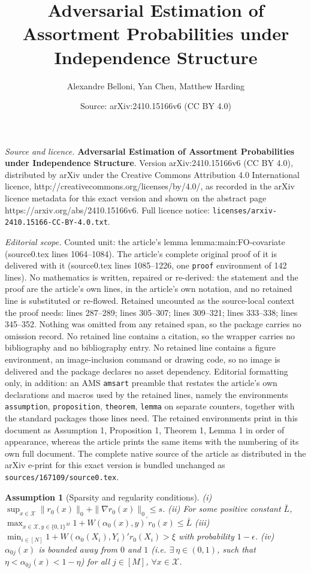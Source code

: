 \documentclass[10pt,a4paper]{amsart}
\title{{\textbf{\Large{}{}{}{}Adversarial Estimation of Assortment Probabilities under Independence Structure}}}
\author{Alexandre Belloni, Yan Chen, Matthew Harding}
\date{Source: arXiv:2410.15166v6 (CC BY 4.0)}
\newtheorem{assumption}{Assumption}
\begin{document}
\maketitle

\noindent\emph{Source and licence.} {\textbf{\Large{}{}{}{}Adversarial Estimation of Assortment Probabilities under Independence Structure}}. Version arXiv:2410.15166v6 (CC BY 4.0), distributed by arXiv under the Creative Commons Attribution 4.0 International licence, http://creativecommons.org/licenses/by/4.0/, as recorded in the arXiv licence metadata for this exact version and shown on the abstract page https://arxiv.org/abs/2410.15166v6. Full licence notice: \texttt{licenses/arxiv-2410.15166-CC-BY-4.0.txt}.\par\smallskip

\noindent\textit{Editorial scope.} Counted unit: the article's lemma lemma:main:FO-covariate (source0.tex lines 1064--1084). The article's complete original proof of it is delivered with it (source0.tex lines 1085--1226, one \texttt{proof} environment of 142 lines). No mathematics is written, repaired or re-derived: the statement and the proof are the article's own lines, in the article's own notation, and no retained line is substituted or re-flowed.  Retained uncounted as the source-local context the proof needs: lines 287--289; lines 305--307; lines 309--321; lines 333--338; lines 345--352.  Nothing was omitted from any retained span, so the package carries no omission record.  No retained line contains a citation, so the wrapper carries no bibliography and no bibliography entry.  No retained line contains a figure environment, an image-inclusion command or drawing code, so no image is delivered and the package declares no asset dependency.  Editorial formatting only, in addition: an AMS \texttt{amsart} preamble that restates the article's own declarations and macros used by the retained lines, namely the environments \texttt{assumption}, \texttt{proposition}, \texttt{theorem}, \texttt{lemma} on separate counters, together with the standard packages those lines need.  The retained environments print in this document as Assumption 1, Proposition 1, Theorem 1, Lemma 1 in order of appearance, whereas the article prints the same items with the numbering of its own full document.  The complete native source of the article as distributed in the arXiv e-print for this exact version is bundled unchanged as \texttt{sources/167109/source0.tex}.
\begin{assumption}[Sparsity and regularity conditions]\label{ass:iid-min-den}
(i) $\sup_{x \in \mathcal{X}} \|r_0(x)\|_0+\|\nabla r_0(x)\|_0 \leq s$. (ii) For some positive constant $\bar{L}$, ${ \displaystyle \max_{x\in\mathcal{X}, y\in \{0,1\}^M}} 1+W(\alpha_0(x),y)^\prime r_0(x) \leq \bar L$ (iii) ${ \displaystyle \min_{i\in [N]}} 1+W(\alpha_0(X_i),Y_i)'r_0(X_i) > \xi$ with probability $1-\epsilon$. (iv) $\alpha_{0j}(x)$ is bounded away from $0$ and $1$ (i.e. $\exists\ \eta\in(0,1)$, such that $\eta<\alpha_{0j}(x)<1-\eta$) for all $j\in[M]$, $\forall x\in\mathcal{X}$. 
\end{assumption}
\end{document}
